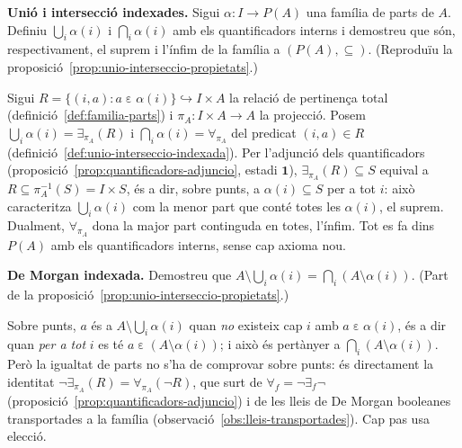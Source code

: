 \begin{exercici}
\textbf{Unió i intersecció indexades.} Sigui \(\alpha\colon I\to P(A)\) una família de parts de \(A\). Definiu \(\bigcup_{i}\alpha(i)\) i \(\bigcap_{i}\alpha(i)\) amb els quantificadors interns i demostreu que són, respectivament, el suprem i l'ínfim de la família a \((P(A),\subseteq)\). (Reproduïu la proposició~\ref{prop:unio-interseccio-propietats}.)
\end{exercici}
\begin{solucio}
Sigui \(R=\{(i,a) : a\mathrel{\varepsilon}\alpha(i)\}\hookrightarrow I\times A\) la relació de pertinença total (definició~\ref{def:familia-parts}) i \(\pi_A\colon I\times A\to A\) la projecció. Posem \(\bigcup_i\alpha(i)=\exists_{\pi_A}(R)\) i \(\bigcap_i\alpha(i)=\forall_{\pi_A}\) del predicat \((i,a)\in R\) (definició~\ref{def:unio-interseccio-indexada}). Per l'adjunció dels quantificadors (proposició~\ref{prop:quantificadors-adjuncio}, estadi \(\mathbf1\)), \(\exists_{\pi_A}(R)\subseteq S\) equival a \(R\subseteq\pi_A^{-1}(S)=I\times S\), és a dir, sobre punts, a \(\alpha(i)\subseteq S\) per a tot \(i\): això caracteritza \(\bigcup_i\alpha(i)\) com la menor part que conté totes les \(\alpha(i)\), el suprem. Dualment, \(\forall_{\pi_A}\) dona la major part continguda en totes, l'ínfim. Tot es fa dins \(P(A)\) amb els quantificadors interns, sense cap axioma nou.
\end{solucio}

\begin{exercici}
\textbf{De Morgan indexada.} Demostreu que \(A\setminus\bigcup_i\alpha(i)=\bigcap_i(A\setminus\alpha(i))\). (Part de la proposició~\ref{prop:unio-interseccio-propietats}.)
\end{exercici}
\begin{solucio}
Sobre punts, \(a\) és a \(A\setminus\bigcup_i\alpha(i)\) quan \emph{no} existeix cap \(i\) amb \(a\mathrel{\varepsilon}\alpha(i)\), és a dir quan \emph{per a tot} \(i\) es té \(a\mathrel{\varepsilon}(A\setminus\alpha(i))\); i això és pertànyer a \(\bigcap_i(A\setminus\alpha(i))\). Però la igualtat de parts no s'ha de comprovar sobre punts: és directament la identitat \(\neg\exists_{\pi_A}(R)=\forall_{\pi_A}(\neg R)\), que surt de \(\forall_f=\neg\exists_f\neg\) (proposició~\ref{prop:quantificadors-adjuncio}) i de les lleis de De Morgan booleanes transportades a la família (observació~\ref{obs:lleis-transportades}). Cap pas usa elecció.
\end{solucio}

